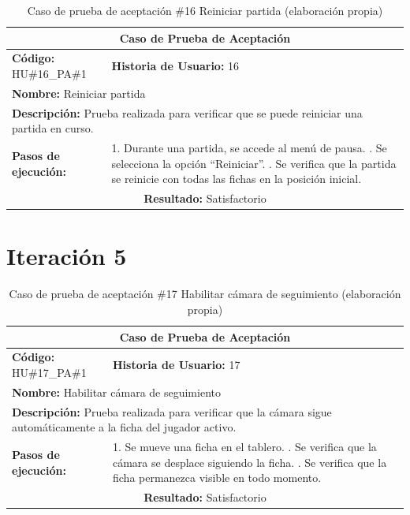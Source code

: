 \begin{table}[H]
\centering
\caption{Caso de prueba de aceptación \#16 Reiniciar partida (elaboración propia)\label{tab:cpa16}}
\renewcommand{\arraystretch}{1.3}
\begin{tabular}{|p{}|p{}|}
\hline
\multicolumn{2}{|c|}{\textbf{Caso de Prueba de Aceptación}} \\
\hline
\textbf{Código:} HU\#16\_PA\#1 & \textbf{Historia de Usuario:} 16 \\
\hline
\multicolumn{2}{|l|}{\textbf{Nombre:} Reiniciar partida} \\
\hline
\multicolumn{2}{|p{0.9\textwidth}|}{\textbf{Descripción:} Prueba realizada para verificar que se puede reiniciar una partida en curso.} \\
\hline
\textbf{Pasos de ejecución:} & 1. Durante una partida, se accede al menú de pausa. \newline 2. Se selecciona la opción ``Reiniciar''. \newline 3. Se verifica que la partida se reinicie con todas las fichas en la posición inicial. \\
\hline
\multicolumn{2}{|c|}{\textbf{Resultado:} Satisfactorio} \\
\hline
\end{tabular}
\end{table}

\section*{Iteración 5}

\begin{table}[H]
\centering
\caption{Caso de prueba de aceptación \#17 Habilitar cámara de seguimiento (elaboración propia)\label{tab:cpa17}}
\renewcommand{\arraystretch}{1.3}
\begin{tabular}{|p{}|p{}|}
\hline
\multicolumn{2}{|c|}{\textbf{Caso de Prueba de Aceptación}} \\
\hline
\textbf{Código:} HU\#17\_PA\#1 & \textbf{Historia de Usuario:} 17 \\
\hline
\multicolumn{2}{|l|}{\textbf{Nombre:} Habilitar cámara de seguimiento} \\
\hline
\multicolumn{2}{|p{0.9\textwidth}|}{\textbf{Descripción:} Prueba realizada para verificar que la cámara sigue automáticamente a la ficha del jugador activo.} \\
\hline
\textbf{Pasos de ejecución:} & 1. Se mueve una ficha en el tablero. \newline 2. Se verifica que la cámara se desplace siguiendo la ficha. \newline 3. Se verifica que la ficha permanezca visible en todo momento. \\
\hline
\multicolumn{2}{|c|}{\textbf{Resultado:} Satisfactorio} \\
\hline
\end{tabular}
\end{table}

